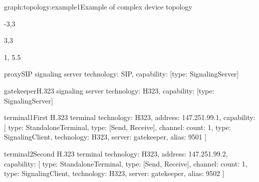 \documentclass[a4paper]{report}
\begin{document}
\begin{Graph}{graph:topology:example1}{Example of complex device topology}  
  \begin{SubGraph}{-3,3}{}
  \end{SubGraph}
  
  \begin{SubGraph}{3,3}{}
  \end{SubGraph}
  
  
  \begin{GraphLegend}{1, 5.5}
  \end{GraphLegend}
\end{Graph}

\begin{TopologyExample}{proxy}{SIP signaling server}
technology: SIP, capability: [{type: SignalingServer}]
\end{TopologyExample}

\begin{TopologyExample}{gatekeeper}{H.323 signaling server}
technology: H323, capability: [{type: SignalingServer}]
\end{TopologyExample}

\begin{TopologyExample}{terminal1}{First H.323 terminal}
technology: H323, address: 147.251.99.1,
capability: [
  {type: StandaloneTerminal}, {type: [Send, Receive], channel: {count: 1}}, 
  {type: SignalingClient, technology: H323, server: gatekeeper, alias: 9501}
]
\end{TopologyExample}

\begin{TopologyExample}{terminal2}{Second H.323 terminal}
technology: H323, address: 147.251.99.2,
capability: [
  {type: StandaloneTerminal}, {type: [Send, Receive], channel: {count: 1}}, 
  {type: SignalingClient, technology: H323, server: gatekeeper, alias: 9502}
]
\end{TopologyExample}
\end{document}
